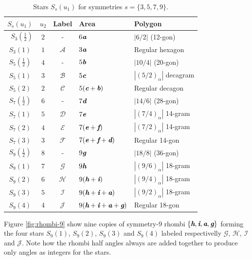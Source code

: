 \documentclass[11pt]{article}
\def\mathbi#1{\textbf{\em #1}}
\begin{document}
\begin{table}[H]
\begin{center}
\begin{tabular}{|c|c|c|l|l|}
\hline
$S_s(u_1)$ & $u_2$ & Label & Area & Polygon \\ \hline\
$S_3(\frac{1}2)$ & $2$ & -     & $6\mathbi{a}$ & $|6/2|$ (12-gon) \\[0.5ex]
$S_3(1)$         & $1$ & $\mathcal{A}$ & $3\mathbi{a}$ & Regular hexagon \\[0.5ex]
\hline
$S_5(\frac{1}2)$ & $4$ & -      & $5\mathbi{b}$ & $|10/4|$ (20-gon)\\[0.5ex]
$S_5(1)$ & $3$ & $\mathcal{B}$ & $5\mathbi{c}$ & $|(5/2)_\alpha|$ decagram\\[0.5ex]
$S_5(2)$ & $2$ & $\mathcal{C}$ & $5(\mathbi{c}+\mathbi{b})$ & Regular decagon\\[0.5ex]
\hline
$S_7(\frac{1}2)$ & $6$ & -     & $7\mathbi{d}$ & $|14/6|$ (28-gon)\\[0.5ex]
$S_7(1)$ & $5$ & $\mathcal{D}$ & $7\mathbi{e}$ & $|(7/4)_\alpha|$ 14-gram\\[0.5ex]
$S_7(2)$ & $4$ & $\mathcal{E}$ & $7(\mathbi{e}+\mathbi{f})$ & $|(7/2)_\alpha|$ 14-gram\\[0.5ex]
$S_7(3)$ & $3$ & $\mathcal{F}$ & $7(\mathbi{e}+\mathbi{f}+\mathbi{d})$ & Regular 14-gon\\[0.5ex]
\hline
$S_9(\frac{1}2)$ & $8$ & -     & $9\mathbi{g}$ & $|18/8|$ (36-gon)\\[0.5ex]
$S_9(1)$ & $7$ & $\mathcal{G}$ & $9\mathbi{h}$ & $|(9/6)_\alpha|$ 18-gram\\[0.5ex]
$S_9(2)$ & $6$ & $\mathcal{H}$ & $9(\mathbi{h}+\mathbi{i})$ & $|(9/4)_\alpha|$ 18-gram\\[0.5ex]
$S_9(3)$ & $5$ & $\mathcal{I}$ & $9(\mathbi{h}+\mathbi{i}+\mathbi{a})$ & $|(9/2)_\alpha|$ 18-gram\\[0.5ex]
$S_9(4)$ & $4$ & $\mathcal{J}$ & $9(\mathbi{h}+\mathbi{i}+\mathbi{a}+\mathbi{g})$ & Regular 18-gon\\[0.5ex]
\hline
\end{tabular}
\caption{Stars $S_s(u_1)$ for symmetries $s = \{3,5,7,9\}$.}
\label{tbl:stars}
\end{center}
\end{table}

Figure \ref{fig:rhombi-9} show nine copies of symmetry-9 rhombi $\{\mathbi{h},\mathbi{i},\mathbi{a},\mathbi{g}\}$ forming the four stars $S_9(1)$, $S_9(2)$, $S_9(3)$ and $S_9(4)$ labeled respectivelly $\mathcal{G}$, $\mathcal{H}$, $\mathcal{I}$ and $\mathcal{J}$. Note how the rhombi half angles always are added together to produce only angles as integers for the stars.
\end{document}
